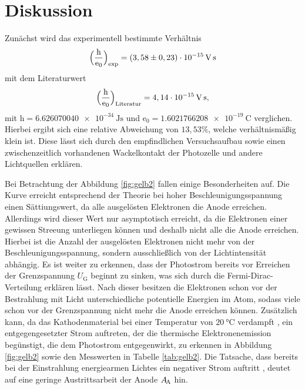 \section{Diskussion}
\label{sec:Diskussion}

Zunächst wird das experimentell bestimmte Verhältnis 
\begin{align*}
\Bigl(\frac{\mathrm{h}}{\mathrm{e_0}}\Bigr)_\text{exp} = (3,58 \pm 0,23)\cdot 10^{-15}\,\si{\volt\second} 
\end{align*}
mit dem Literaturwert 
\begin{align*}
\Bigl(\frac{\mathrm{h}}{\mathrm{e_0}}\Bigr)_\text{Literatur} = 4,14 \cdot 10^{-15}\,\si{\volt\second}, 
\end{align*}
mit $\mathrm{h} = \SI{6.626070040e-34}{\joule\second}$ \cite{h} und $\mathrm{e_0} = \SI{1.6021766208e-19}{\coulomb}$ \cite{e} verglichen.
Hierbei ergibt sich eine relative Abweichung von $13,53\%$, welche verhältnismäßig klein ist.
Diese lässt sich durch den empfindlichen Versuchsaufbau sowie einen zwischenzeitlich vorhandenen
Wackelkontakt der Photozelle und andere Lichtquellen erklären.

\noindent Bei Betrachtung der Abbildung \ref{fig:gelb2} fallen einige Besonderheiten auf.
Die Kurve erreicht entsprechend der Theorie bei hoher Beschleunigungsspannung einen Sättiungswert,
da alle ausgelösten Elektronen die Anode erreichen. Allerdings wird dieser Wert nur asymptotisch erreicht, da die Elektronen einer gewissen Streeung unterliegen können und deshalb nicht alle die Anode erreichen.
Hierbei ist die Anzahl der ausgelösten Elektronen nicht mehr von der Beschleunigungsspannung, sondern ausschließlich von der Lichtintensität abhängig.
Es ist weiter zu erkennen, dass der Photostrom bereits vor Erreichen der Grenzspannung $U_\text{G}$
beginnt zu sinken, was sich durch die Fermi-Dirac-Verteilung erklären lässt. Nach dieser besitzen die
Elektronen schon vor der Bestrahlung mit Licht unterschiedliche potentielle Energien im Atom, sodass viele
schon vor der Grenzspannung nicht mehr die Anode erreichen können. Zusätzlich kann, da das 
Kathodenmaterial bei einer Temperatur von $\SI{20}{\celsius}$
verdampft \cite{kent}, ein entgegengesetzter Strom auftreten, 
der die thermische Elektronenemission begünstigt, die dem Photostrom entgegenwirkt, zu erkennen in Abbildung \ref{fig:gelb2}
sowie den Messwerten in Tabelle \ref{tab:gelb2}.
Die Tatsache, dass bereits bei der Einstrahlung energiearmen Lichtes ein negativer Strom auftritt \cite{kent}, deutet auf eine geringe
Austrittsarbeit der Anode $A_\text{\!A}$ hin.

